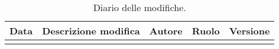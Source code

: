 \small
\begin{longtable}{|c|m{4cm}|>{\centering}m{2.7cm}|c|c|}
\hline 
\textbf{Data} & \textbf{Descrizione modifica} & \textbf{Autore} & \textbf{Ruolo} & \textbf{Versione}\\ \hline \endhead

\caption{Diario delle modifiche.}
\label{tabella:diarioModifiche}
\end{longtable}
\clearpage
